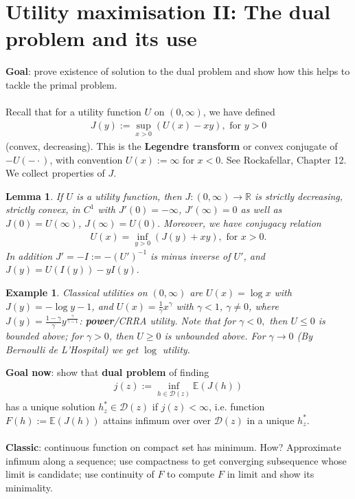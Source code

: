 \documentclass[12pt,a4paper, twoside]{article}
\newtheorem{lem}{Lemma}[section]
\newtheorem{exmp}{Example}[section]
\theoremstyle{definition}
\newcommand{\EE}{\mathbb{E}} %
\begin{document}
\section{Utility maximisation II: The dual problem and its use}
\textbf{Goal}: prove existence of solution to the dual problem and show how this helps to tackle the primal problem. \\
\\
Recall that for a utility function $U$ on $(0, \infty)$, we have defined
\begin{align*}
J(y):= \sup_{x >0} (U(x)-xy), \text{ for } y>0
\end{align*}
(convex, decreasing). This is the \textbf{Legendre transform} or convex conjugate of $-U(- \cdot)$, with convention $U(x):= \infty$ for $x<0$. See Rockafellar, Chapter 12. We collect properties of $J$.
\begin{lem}\label{L111} If $U$ is a utility function, then $J: (0, \infty) \to \mathbb{R}$ is strictly decreasing, strictly convex, in $C^1$ with $J'(0)= - \infty$, $J'( \infty)= 0$ as well as $J(0)=U( \infty)$, $J( \infty)=U(0).$ Moreover, we have conjugacy relation
\begin{align*}
U(x)= \inf_{y >0} (J(y) + xy), \text{ for } x>0.
\end{align*}
In addition $J'=-I:= -(U')^{-1}$ is minus inverse of $U'$, and $J(y)=U(I(y))-yI(y).$ 
\end{lem}
\begin{exmp} Classical utilities on $(0, \infty)$ are $U(x)= \log x$ with $J(y)= - \log y-1$, and $U(x)= \frac{1}{\gamma}x^\gamma$ with $\gamma <1$, $\gamma \neq 0$, where $J(y)= \frac{1- \gamma}{\gamma} y^{\frac{\gamma}{\gamma-1}}$: \textbf{power}/CRRA utility. Note that for $\gamma <0,$ then $U \leq 0$ is bounded above; for $\gamma >0$, then $U \geq 0$ is unbounded above. For $\gamma \to 0$ (By Bernoulli de L'Hospital) we get $\log$ utility. 
\end{exmp}
\noindent \textbf{Goal now}: show that \textbf{dual problem} of finding 
\begin{align*}
j(z):= \inf_{h \in \mathcal{D}(z)} \EE(J(h))
\end{align*}
has a unique solution $h_z^* \in \mathcal{D}(z)$ if $j(z) < \infty$, i.e. function $F(h):= \EE(J(h))$ attains infimum over over $\mathcal{D}(z)$ in a unique $h_z^*$. 
\\\\
\textbf{Classic}: continuous function on compact set has minimum. How? Approximate infimum along a sequence; use compactness to get converging subsequence whose limit is candidate; use continuity of $F$ to compute $F$ in limit and show its minimality. 
\end{document}
